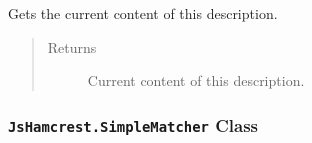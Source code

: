 \documentclass[letterpaper,10pt,english]{sphinxmanual}
\begin{document}

\begin{fulllineitems}
\label{modules/jshamcrest:JsHamcrest.Description.get}
Gets the current content of this description.
\begin{quote}\begin{description}
\item[{Returns}] \leavevmode
Current content of this description.

\end{description}\end{quote}

\end{fulllineitems}



\subsubsection{\texttt{JsHamcrest.SimpleMatcher} Class}
\label{modules/jshamcrest:jshamcrest-simplematcher-class}
\end{document}
